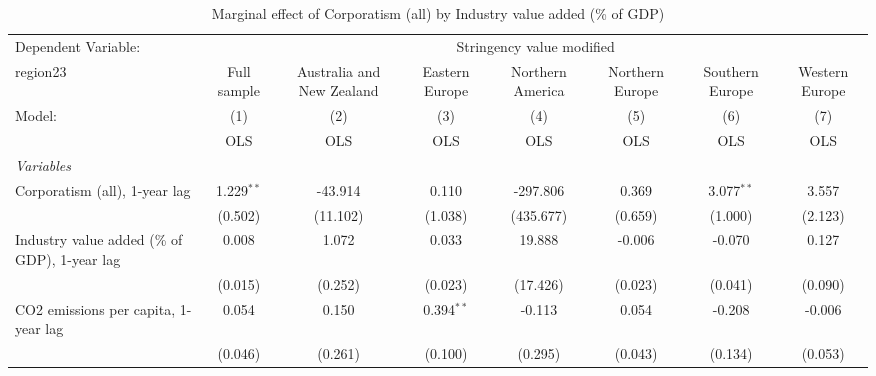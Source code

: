 
\begin{table}[htbp]
   \caption{Marginal effect of Corporatism (all) by Industry value added (\% of GDP)}
   \centering
   \begin{tabular}{lccccccc}
      \toprule
      Dependent Variable: & \multicolumn{7}{c}{Stringency value modified}\\
      region23                                                                      & Full sample   & Australia and New Zealand & Eastern Europe & Northern America & Northern Europe & Southern Europe & Western Europe \\   
      Model:                                                                        & (1)           & (2)                       & (3)            & (4)              & (5)             & (6)             & (7)\\  
                                                                                    &  OLS          & OLS                       & OLS            & OLS              & OLS             & OLS             & OLS\\  
      \midrule
      \emph{Variables}\\
      Corporatism (all), 1-year lag                                                 & 1.229$^{**}$  & -43.914                   & 0.110          & -297.806         & 0.369           & 3.077$^{**}$    & 3.557\\   
                                                                                    & (0.502)       & (11.102)                  & (1.038)        & (435.677)        & (0.659)         & (1.000)         & (2.123)\\   
      Industry value added (\% of GDP), 1-year lag                                  & 0.008         & 1.072                     & 0.033          & 19.888           & -0.006          & -0.070          & 0.127\\   
                                                                                    & (0.015)       & (0.252)                   & (0.023)        & (17.426)         & (0.023)         & (0.041)         & (0.090)\\   
      CO2 emissions per capita, 1-year lag                                          & 0.054         & 0.150                     & 0.394$^{**}$   & -0.113           & 0.054           & -0.208          & -0.006\\   
                                                                                    & (0.046)       & (0.261)                   & (0.100)        & (0.295)          & (0.043)         & (0.134)         & (0.053)\\   

\end{tabular}
\end{table}
